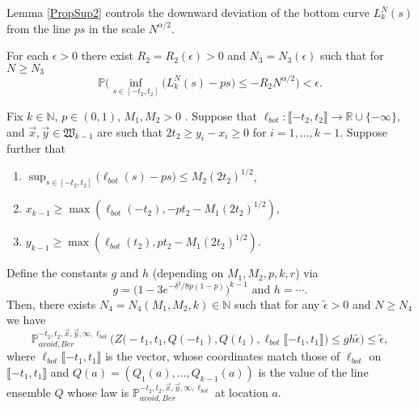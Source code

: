 Lemma \ref{PropSup2} controls the downward deviation of the bottom curve $L^N_k(s)$ from the line $ps$ in the scale $N^{\alpha/2}$.
\begin{lemma}\label{PropSup2} For each $\epsilon > 0$ there exist $R_2=R_2( \epsilon) > 0$ and $N_3=N_3(\epsilon)$ such that for $N \geq N_3$
$$\mathbb{P}\Big( \inf_{s \in [ -t_2, t_2 ]}\big(L^N_k(s) - p s \big) \leq - R_2N^{\alpha/2} \Big) < \epsilon.$$
\end{lemma}

\begin{lemma}\label{LemmaAP1} Fix $k \in \mathbb{N}$, $p \in (0,1)$, $M_1, M_2 > 0$ . Suppose that $\ell_{bot}: \llbracket -t_2, t_2 \rrbracket \rightarrow \mathbb{R} \cup \{ - \infty \}$, and $\vec{x}, \vec{y} \in \mathfrak{W}_{k-1}$ are such that $2t_2 \geq y_i-x_i \geq 0$ for $i = 1, \dots, k-1$. Suppose further that
	\begin{enumerate}
		\item $\sup_{s \in [ -t_2,t_2]}\big(\ell_{bot}(s)  - ps \big)  \leq M_2 (2t_2)^{1/2}$,
		\item  $ x_{k-1} \geq \max\left(\ell_{bot}(-t_2), -pt_2- M_1 (2t_2)^{1/2}\right),$
		\item $ y_{k-1} \geq  \max \left( \ell_{bot}(t_2),  p t_2- M_1(2t_2)^{1/2} \right).$
	\end{enumerate}
	Define the constants $g$ and $h$ (depending on $ M_1, M_2, p , k, r$) via
	$$g =  \big(1-3e^{-\delta^2/8p(1-p)}\big)^{k-1} \mbox{ and } h = \cdots .$$
	Then, there exists $N_4 = N_4(M_1,M_2,k ) \in \mathbb{N}$  such that for any $\tilde{\epsilon}  > 0$ and $N \geq N_4$ we have
	\begin{equation}\label{eqn60}
	\mathbb{P}^{-t_2, t_2, \vec{x},\vec{y}, \infty, \ell_{bot} }_{avoid, Ber} \Big( Z\big(  -t_1, t_1, Q(-t_1) ,Q(t_1), \ell_{bot}\llbracket -t_1, t_1\rrbracket\big) \leq  gh \tilde{\epsilon}   \Big)  \leq \tilde{\epsilon},
	\end{equation}
	where $\ell_{bot}\llbracket -t_1, t_1\rrbracket$ is the vector, whose coordinates match those of $\ell_{bot}$ on $\llbracket -t_1, t_1\rrbracket$ and $Q(a) = (Q_1(a), \dots, Q_{k-1}(a))$ is the value of the line ensemble $Q$ whose law is $\mathbb{P}^{-t_2, t_2, \vec{x},\vec{y}, \infty, \ell_{bot} }_{avoid, Ber}$ at location $a$.
\end{lemma}


